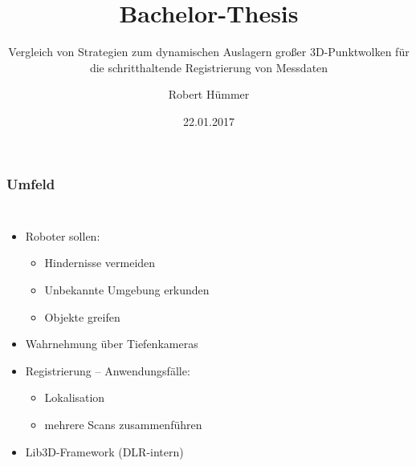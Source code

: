 \documentclass[presentation]{beamer}
\title[Bachelor-Thesis]{Bachelor-Thesis} %
\subtitle{Vergleich von Strategien zum dynamischen Auslagern großer 3D-Punktwolken für die schritthaltende Registrierung von Messdaten}
\author{Robert Hümmer} %
\institute[Fakultät für Informatik] %
{
	University of Applied Science Rosenheim \\
	\medskip
	\textit{robert.huemmer@gmail.com} %
}
\date{22.01.2017} %
\begin{document}

\maketitle %

\begin{frame}
\frametitle{Umfeld}

\begin{columns}[c] %
	\begin{itemize}
		\item Roboter sollen:
		\begin{itemize} 
			\item Hindernisse vermeiden
			\item Unbekannte Umgebung erkunden
			\item Objekte greifen
		\end{itemize}
		\item Wahrnehmung über Tiefenkameras
		\item Registrierung -- Anwendungsfälle:
		\begin{itemize}
		\item Lokalisation
		\item mehrere Scans zusammenführen
		\end{itemize}
		\item Lib3D-Framework (DLR-intern)
	\end{itemize}
	\begin{figure}
		\centering

\end{figure}
\end{columns}
\end{frame}
\end{document}
